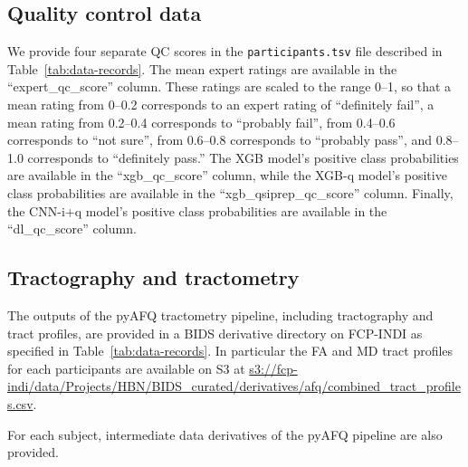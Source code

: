 \documentclass[fleqn,10pt,inline]{wlscirep}
\begin{document}
\subsection*{Quality control data}

We provide four separate QC scores in the \texttt{participants.tsv} file described in Table~\ref{tab:data-records}. The mean expert ratings are available in the ``expert\_qc\_score'' column.
These ratings are scaled to the range \numrange{0}{1}, so that a mean rating from \numrange{0}{0.2} corresponds to an expert rating of ``definitely fail'', a mean rating from \numrange{0.2}{0.4} corresponds to ``probably fail'', from \numrange{0.4}{0.6} corresponds to ``not sure'', from \numrange{0.6}{0.8} corresponds to ``probably pass'', and \numrange{0.8}{1.0} corresponds to ``definitely pass.''
The XGB model's positive class probabilities are available in the ``xgb\_qc\_score'' column,
while the XGB-q model's positive class probabilities are available in the ``xgb\_qsiprep\_qc\_score'' column.
Finally, the CNN-i+q model's positive class probabilities are available in the ``dl\_qc\_score'' column.

\subsection*{Tractography and tractometry}

The outputs of the pyAFQ tractometry pipeline, including tractography and tract profiles, are provided in a BIDS derivative directory on FCP-INDI as specified in Table~\ref{tab:data-records}. In particular the FA and MD tract profiles for each participants are available on S3 at \url{s3://fcp-indi/data/Projects/HBN/BIDS_curated/derivatives/afq/combined_tract_profiles.csv}.

For each subject, intermediate data derivatives of the pyAFQ pipeline are also provided. 
\end{document}
